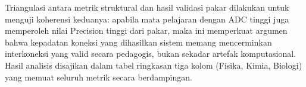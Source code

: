 \documentclass[main]{subfiles}
\begin{document}
Triangulasi antara metrik struktural dan hasil validasi pakar dilakukan
untuk menguji koherensi keduanya: apabila mata pelajaran dengan ADC
tinggi juga memperoleh nilai Precision tinggi dari pakar,
maka ini memperkuat argumen bahwa kepadatan koneksi yang dihasilkan
sistem memang mencerminkan interkoneksi yang valid secara pedagogis,
bukan sekadar artefak komputasional. Hasil analisis disajikan dalam
tabel ringkasan tiga kolom (Fisika, Kimia, Biologi) yang memuat seluruh
metrik secara berdampingan.

\ifSubfilesClassLoaded{\printbibliography[title={Daftar Pustaka}]}{}
\end{document}

